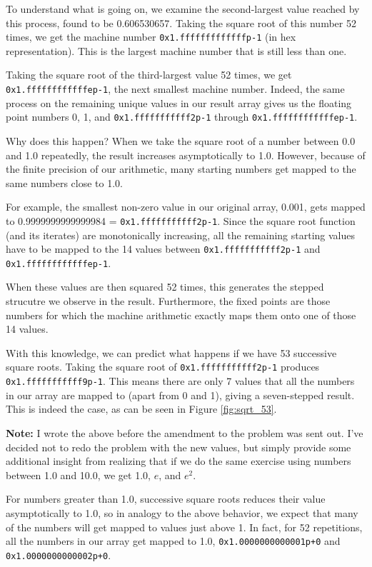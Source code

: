 \documentclass[12pt]{article}
\begin{document}
To understand what is going on, we examine the second-largest value reached by this process, found to be 0.606530657. Taking the square root of this number 52 times, we get the machine number \texttt{0x1.fffffffffffffp-1} (in hex representation). This is the largest machine number that is still less than one.

Taking the square root of the third-largest value 52 times, we get \texttt{0x1.ffffffffffffep-1}, the next smallest machine number. Indeed, the same process on the remaining unique values in our result array gives us the floating point numbers 0, 1, and \texttt{0x1.fffffffffff2p-1} through \texttt{0x1.ffffffffffffep-1}. 

Why does this happen? When we take the square root of a number between 0.0 and 1.0 repeatedly, the result increases asymptotically to 1.0. However, because of the finite precision of our arithmetic, many starting numbers get mapped to the same numbers close to 1.0.

For example, the smallest non-zero value in our original array, 0.001, gets mapped to 0.9999999999999984 = \texttt{0x1.fffffffffff2p-1}. Since the square root function (and its iterates) are monotonically increasing, all the remaining starting values have to be mapped to the 14 values between \texttt{0x1.fffffffffff2p-1} and \texttt{0x1.ffffffffffffep-1}.

When these values are then squared 52 times, this generates the stepped strucutre we observe in the result. Furthermore, the fixed points are those numbers for which the machine arithmetic exactly maps them onto one of those 14 values.

With this knowledge, we can predict what happens if we have 53 successive square roots. Taking the square root of \texttt{0x1.fffffffffff2p-1} produces \texttt{0x1.fffffffffff9p-1}. This means there are only 7 values that all the numbers in our array are mapped to (apart from 0 and 1), giving a seven-stepped result. This is indeed the case, as can be seen in Figure \ref{fig:sqrt_53}.

\textbf{Note:} I wrote the above before the amendment to the problem was sent out. I've decided not to redo the problem with the new values, but simply provide some additional insight from realizing that if we do the same exercise using numbers between 1.0 and 10.0, we get 1.0, $e$, and $e^2$. 

For numbers greater than 1.0, successive square roots reduces their value asymptotically to 1.0, so in analogy to the above behavior, we expect that many of the numbers will get mapped to values just above 1. In fact, for 52 repetitions, all the numbers in our array get mapped to 1.0, \texttt{0x1.0000000000001p+0} and \texttt{0x1.0000000000002p+0}.
\end{document}

